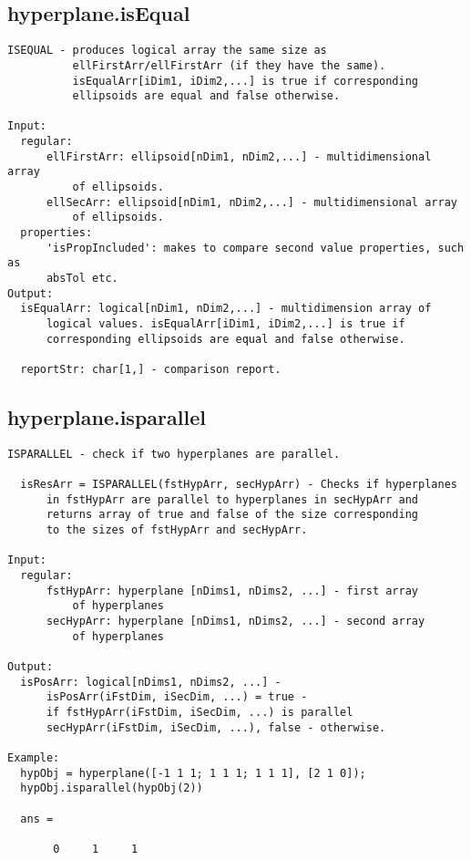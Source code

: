 \subsection{\texorpdfstring{hyperplane.isEqual}{isEqual}}\label{method:hyperplane.isEqual}
\begin{verbatim}
ISEQUAL - produces logical array the same size as
          ellFirstArr/ellFirstArr (if they have the same).
          isEqualArr[iDim1, iDim2,...] is true if corresponding
          ellipsoids are equal and false otherwise.

Input:
  regular:
      ellFirstArr: ellipsoid[nDim1, nDim2,...] - multidimensional array
          of ellipsoids.
      ellSecArr: ellipsoid[nDim1, nDim2,...] - multidimensional array
          of ellipsoids.
  properties:
      'isPropIncluded': makes to compare second value properties, such as
      absTol etc.
Output:
  isEqualArr: logical[nDim1, nDim2,...] - multidimension array of
      logical values. isEqualArr[iDim1, iDim2,...] is true if
      corresponding ellipsoids are equal and false otherwise.

  reportStr: char[1,] - comparison report.
\end{verbatim}
\subsection{\texorpdfstring{hyperplane.isparallel}{isparallel}}\label{method:hyperplane.isparallel}
\begin{verbatim}
ISPARALLEL - check if two hyperplanes are parallel.

  isResArr = ISPARALLEL(fstHypArr, secHypArr) - Checks if hyperplanes
      in fstHypArr are parallel to hyperplanes in secHypArr and
      returns array of true and false of the size corresponding
      to the sizes of fstHypArr and secHypArr.

Input:
  regular:
      fstHypArr: hyperplane [nDims1, nDims2, ...] - first array
          of hyperplanes
      secHypArr: hyperplane [nDims1, nDims2, ...] - second array
          of hyperplanes

Output:
  isPosArr: logical[nDims1, nDims2, ...] -
      isPosArr(iFstDim, iSecDim, ...) = true -
      if fstHypArr(iFstDim, iSecDim, ...) is parallel
      secHypArr(iFstDim, iSecDim, ...), false - otherwise.

Example:
  hypObj = hyperplane([-1 1 1; 1 1 1; 1 1 1], [2 1 0]);
  hypObj.isparallel(hypObj(2))

  ans =

       0     1     1
\end{verbatim}
